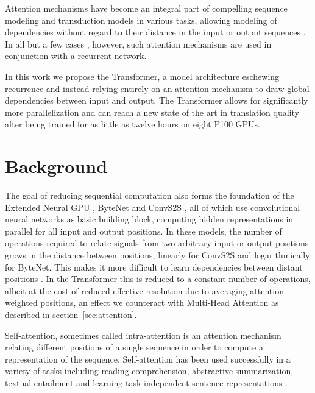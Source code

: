 \documentclass{article}
\begin{document}
Attention mechanisms have become an integral part of compelling sequence modeling and transduction models in various tasks, allowing modeling of dependencies without regard to their distance in the input or output sequences \citep{bahdanau2014neural, structuredAttentionNetworks}. In all but a few cases \citep{decomposableAttnModel}, however, such attention mechanisms are used in conjunction with a recurrent network.



In this work we propose the Transformer, a model architecture eschewing recurrence and instead relying entirely on an attention mechanism to draw global dependencies between input and output. The Transformer allows for significantly more parallelization and can reach a new state of the art in translation quality after being trained for as little as twelve hours on eight P100 GPUs. 


%
 
\section{Background}

The goal of reducing sequential computation also forms the foundation of the Extended Neural GPU \citep{extendedngpu}, ByteNet \citep{NalBytenet2017} and ConvS2S \citep{JonasFaceNet2017}, all of which use convolutional neural networks as basic building block, computing hidden representations in parallel for all input and output positions. In these models, the number of operations required to relate signals from two arbitrary input or output positions grows in the distance between positions, linearly for ConvS2S and logarithmically for ByteNet. This makes it more difficult to learn dependencies between distant positions \citep{hochreiter2001gradient}. In the Transformer this is reduced to a constant number of operations, albeit at the cost of reduced effective resolution due to averaging attention-weighted positions, an effect we counteract with Multi-Head Attention as described in section~\ref{sec:attention}. 

Self-attention, sometimes called intra-attention is an attention mechanism relating different positions of a single sequence in order to compute a representation of the sequence. Self-attention has been used successfully in a variety of tasks including reading comprehension, abstractive summarization, textual entailment and learning task-independent sentence representations \citep{cheng2016long, decomposableAttnModel, paulus2017deep, lin2017structured}.
\end{document}
